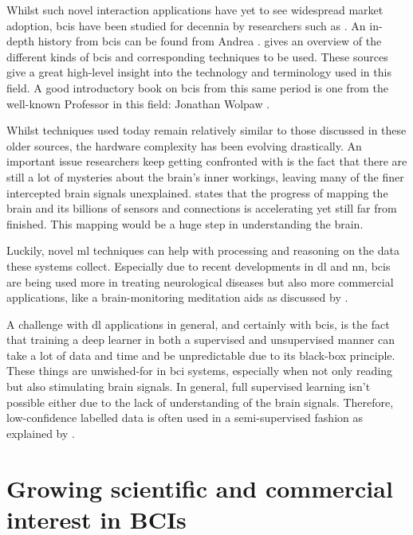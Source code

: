 Whilst such novel interaction applications have yet to see widespread market adoption, \glspl{bci} have been studied for decennia by researchers such as \citet{early_bci}.
An in-depth history from \glspl{bci} can be found from Andrea \citet{bci_history}.
\citet{bci_review} gives an overview of the different kinds of \glspl{bci} and corresponding techniques to be used.
These sources give a great high-level insight into the technology and terminology used in this field.
A good introductory book on \glspl{bci} from this same period is one from the well-known Professor in this field: Jonathan Wolpaw \citep{bci_book}.

Whilst techniques used today remain relatively similar to those discussed in these older sources, the hardware complexity has been evolving drastically.
An important issue researchers keep getting confronted with is the fact that there are still a lot of mysteries about the brain's inner workings, leaving many of the finer intercepted brain signals unexplained.
\citet{brainmapping} states that the progress of mapping the brain and its billions of sensors and connections is accelerating yet still far from finished.
This mapping would be a huge step in understanding the brain.

Luckily, novel \gls{ml} techniques can help with processing and reasoning on the data these systems collect.
Especially due to recent developments in \gls{dl} and \gls{nn}, \glspl{bci} are being used more in treating neurological diseases \citep{bci_diseases} but also more commercial applications, like a brain-monitoring meditation aids as discussed by \citet{interaxon_tests}.

A challenge with \gls{dl} applications in general, and certainly with \glspl{bci}, is the fact that training a deep learner in both a supervised and unsupervised manner can take a lot of data and time and be unpredictable due to its black-box principle.
These things are unwished-for in \gls{bci} systems, especially when not only reading but also stimulating brain signals.
In general, full supervised learning isn't possible either due to the lack of understanding of the brain signals.
Therefore, low-confidence labelled data is often used in a semi-supervised fashion as explained by \citet{deep_learn_low_label}.


\section{Growing scientific and commercial interest in BCIs}
\label{sec:bci_gaining_popularity}

